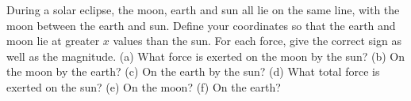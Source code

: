 During a solar eclipse, the moon, earth and sun all lie
on the same line, with the moon between the earth and sun.
Define your coordinates so that the earth and moon lie at
greater $x$ values than the sun. For each force, give the
correct sign as well as the magnitude. (a) What force is
exerted on the moon by the sun? (b) On the moon by the
earth? (c) On the earth by the sun? (d) What total force is
exerted on the sun? (e) On the moon? (f) On the earth?\answercheck
